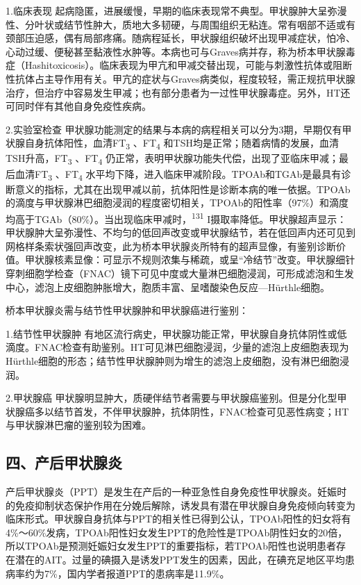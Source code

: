 1.临床表现
起病隐匿，进展缓慢，早期的临床表现常不典型。甲状腺肿大呈弥漫性、分叶状或结节性肿大，质地大多韧硬，与周围组织无粘连。常有咽部不适或有颈部压迫感，偶有局部疼痛。随病程延长，甲状腺组织破坏出现甲减症状，怕冷、心动过缓、便秘甚至黏液性水肿等。本病也可与Graves病并存，称为桥本甲状腺毒症（Hashitoxicosis）。临床表现为甲亢和甲减交替出现，可能与刺激性抗体或阻断性抗体占主导作用有关。甲亢的症状与Graves病类似，程度较轻，需正规抗甲状腺治疗，但治疗中容易发生甲减；也有部分患者为一过性甲状腺毒症。另外，HT还可同时伴有其他自身免疫性疾病。

2.实验室检查
甲状腺功能测定的结果与本病的病程相关可以分为3期，早期仅有甲状腺自身抗体阳性，血清FT\textsubscript{3}
、FT\textsubscript{4}
和TSH均是正常；随着病情的发展，血清TSH升高，FT\textsubscript{3}
、FT\textsubscript{4}
仍正常，表明甲状腺功能失代偿，出现了亚临床甲减；最后血清FT\textsubscript{3}
、FT\textsubscript{4}
水平均下降，进入临床甲减阶段。TPOAb和TGAb是最具有诊断意义的指标，尤其在出现甲减以前，抗体阳性是诊断本病的唯一依据。TPOAb的滴度与甲状腺淋巴细胞浸润的程度密切相关，TPOAb的阳性率（97\%）和滴度均高于TGAb（80\%）。当出现临床甲减时，\textsuperscript{131}
I摄取率降低。甲状腺超声显示：甲状腺肿大呈弥漫性、不均匀的低回声改变或甲状腺结节，若在低回声内还可见到网格样条索状强回声改变，此为桥本甲状腺炎所特有的超声显像，有鉴别诊断价值。甲状腺核素显像：可显示不规则浓集与稀疏，或呈“冷结节”改变。甲状腺细针穿刺细胞学检查（FNAC）镜下可见中度或大量淋巴细胞浸润，可形成滤泡和生发中心，滤泡上皮细胞肿胀增大，胞质丰富、呈嗜酸染色反应---Hürthle细胞。

桥本甲状腺炎需与结节性甲状腺肿和甲状腺癌进行鉴别：

1.结节性甲状腺肿
有地区流行病史，甲状腺功能正常，甲状腺自身抗体阴性或低滴度。FNAC检查有助鉴别。HT可见淋巴细胞浸润，少量的滤泡上皮细胞表现为Hürthle细胞的形态；结节性甲状腺肿则为增生的滤泡上皮细胞，没有淋巴细胞浸润。

2.甲状腺癌
甲状腺明显肿大，质硬伴结节者需要与甲状腺癌鉴别。但是分化型甲状腺癌多以结节首发，不伴甲状腺肿，抗体阴性，FNAC检查可见恶性病变；HT与甲状腺淋巴瘤的鉴别较为困难。

\subsection{四、产后甲状腺炎}

产后甲状腺炎（PPT）是发生在产后的一种亚急性自身免疫性甲状腺炎。妊娠时的免疫抑制状态保护作用在分娩后解除，诱发具有潜在甲状腺自身免疫倾向转变为临床形式。甲状腺自身抗体与PPT的相关性已得到公认，TPOAb阳性的妇女将有4\%～60\%发病，TPOAb阳性妇女发生PPT的危险性是TPOAb阴性妇女的20倍，所以TPOAb是预测妊娠妇女发生PPT的重要指标，若TPOAb阳性也说明患者存在潜在的AIT。过量的碘摄入是诱发PPT发生的因素，因此，在碘充足地区平均患病率约为7\%，国内学者报道PPT的患病率是11.9\%。

